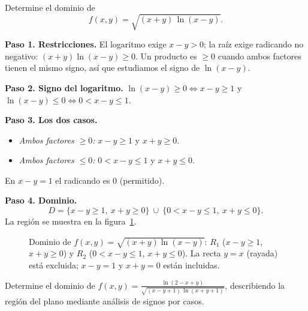 \begin{example}
Determine el dominio de
\[
  f(x,y)=\sqrt{(x+y)\,\ln(x-y)}.
\]
\begin{myproof}
\textbf{Paso 1. Restricciones.}
El logaritmo exige $x-y>0$; la raíz exige radicando no negativo:
$(x+y)\ln(x-y)\ge 0$. Un producto es $\ge 0$ cuando ambos factores tienen el
mismo signo, así que estudiamos el signo de $\ln(x-y)$.

\textbf{Paso 2. Signo del logaritmo.}
$\ln(x-y)\ge 0\iff x-y\ge 1$ y $\ln(x-y)\le 0\iff 0<x-y\le 1$.

\textbf{Paso 3. Los dos casos.}
\begin{itemize}
  \item \emph{Ambos factores $\ge 0$:} $x-y\ge 1$ y $x+y\ge 0$.
  \item \emph{Ambos factores $\le 0$:} $0<x-y\le 1$ y $x+y\le 0$.
\end{itemize}
En $x-y=1$ el radicando es $0$ (permitido).

\textbf{Paso 4. Dominio.}
\[
  \boxed{\ D=\{x-y\ge 1,\ x+y\ge 0\}\ \cup\ \{0<x-y\le 1,\ x+y\le 0\}.\ }
\]
La región se muestra en la figura~\ref{fig:dominio_producto_raiz}.
\end{myproof}
\end{example}

\begin{figure}[!htbp]
\centering
{}
\caption{Dominio de $f(x,y)=\sqrt{(x+y)\ln(x-y)}$: $R_1$ ($x-y\ge 1$,
  $x+y\ge 0$) y $R_2$ ($0<x-y\le 1$, $x+y\le 0$). La recta $y=x$ (rayada) está
  excluida; $x-y=1$ y $x+y=0$ están incluidas.}
\label{fig:dominio_producto_raiz}
\end{figure}

\begin{prob}
Determine el dominio de
$\displaystyle f(x,y)=\frac{\ln(2-x+y)}{\sqrt{(x-y+1)\,\ln(x+y+1)}}$,
describiendo la región del plano mediante análisis de signos por casos.
\end{prob}

